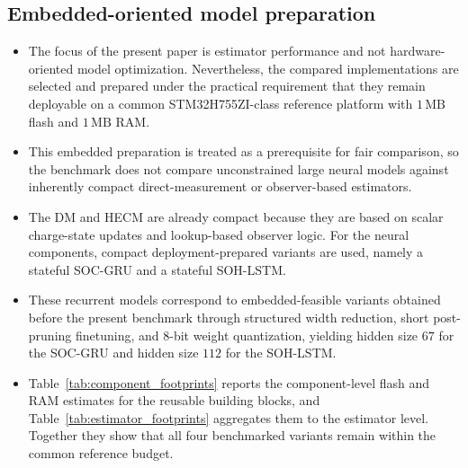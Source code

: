 \documentclass[review]{elsarticle}
\begin{document}
\subsection{Embedded-oriented model preparation}
\begin{itemize}[leftmargin=*]
    \item The focus of the present paper is estimator performance and not hardware-oriented model optimization. Nevertheless, the compared implementations are selected and prepared under the practical requirement that they remain deployable on a common STM32H755ZI-class reference platform with $1\,\mathrm{MB}$ flash and $1\,\mathrm{MB}$ RAM.
    \item This embedded preparation is treated as a prerequisite for fair comparison, so the benchmark does not compare unconstrained large neural models against inherently compact direct-measurement or observer-based estimators.
    \item The DM and HECM are already compact because they are based on scalar charge-state updates and lookup-based observer logic. For the neural components, compact deployment-prepared variants are used, namely a stateful SOC-GRU and a stateful SOH-LSTM.
    \item These recurrent models correspond to embedded-feasible variants obtained before the present benchmark through structured width reduction, short post-pruning finetuning, and $8$-bit weight quantization, yielding hidden size $67$ for the SOC-GRU and hidden size $112$ for the SOH-LSTM.
    \item Table~\ref{tab:component_footprints} reports the component-level flash and RAM estimates for the reusable building blocks, and Table~\ref{tab:estimator_footprints} aggregates them to the estimator level. Together they show that all four benchmarked variants remain within the common reference budget.
\end{itemize}
\end{document}
